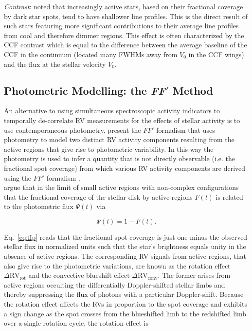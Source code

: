 \emph{Contrast}:
\citep{boisse09} noted that increasingly active stars, based on their fractional coverage by dark
star spots, tend to have shallower line profiles. This is the direct result of such stars featuring
more significant contributions to their average line profiles from cool and therefore dimmer regions.
This effect is often characterized by the CCF contrast which is equal to the difference between the
average baseline of the CCF in the continuum (located many FWHMs away from $V_0$ in
the CCF wings) and the flux at the stellar velocity $V_0$.


\subsection{Photometric Modelling: the \textbf{\emph{FF}}$'$ Method} \label{sect:ffp}
An alternative to using simultaneous spectroscopic activity indicators to temporally de-correlate
RV measurements for the effects of stellar activity is to use contemporaneous photometry.
\cite{aigrain12} present the $FF'$ formalism that uses photometry to model two distinct RV activity
components resulting from the active regions that give rise to photometric variability. In this way
the photometry is used to infer a quantity that is not directly observable (i.e. the fractional spot
coverage) from which various RV activity components are derived using the $FF'$ formalism
\citep{rajpaul15}. \\

\cite{aigrain12}
argue that in the limit of small active regions with non-complex configurations that the fractional
coverage of the stellar disk by active regions $F(t)$ is related to the photometric flux
$\Psi(t)$ via

\begin{equation}
  \Psi(t) = 1 - F(t).
  \label{eq:ffp}
\end{equation}

\noindent Eq.~\ref{eq:ffp} reads that the fractional spot coverage is just one minus the observed
stellar flux in normalized units such that the star's brightness equals unity in the absence of active
regions. The corresponding RV signals from active regions, that also give rise to the photometric variations,
are known
as the rotation effect $\Delta \text{RV}_{\text{rot}}$ and the convective blueshift effect
$\Delta \text{RV}_{\text{conv}}$. The former arises from active regions occulting the differentially
Doppler-shifted stellar limbs and thereby suppressing the flux of photons with a particular
Doppler-shift. Because the rotation effect affects the RVs in proportion to the spot coverage and
exhibits a sign change as the spot crosses from the blueshifted limb to the redshifted limb over a
single rotation cycle, the rotation effect is

